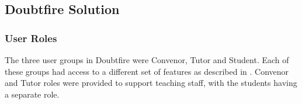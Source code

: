 

\subsection{Doubtfire Solution} %
\label{sub:doubtfire_solution}

\subsubsection{User Roles} %
\label{sub:user_roles}

The three user groups in Doubtfire were Convenor, Tutor and Student. Each of these groups had access to a different set of features as described in . Convenor and Tutor roles were provided to support teaching staff, with the students having a separate role. 

